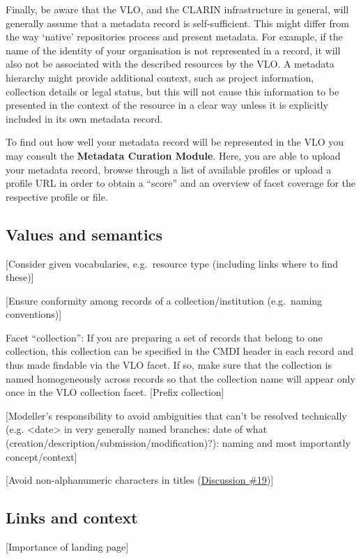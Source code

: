 Finally, be aware that the VLO, and the CLARIN infrastructure in general, will generally assume that a metadata record is
self-sufficient. This might differ from the way `native' repositories process and present metadata. For example, if the name of the identity of your organisation is not represented in a record, it will also not be associated with the described resources by the VLO. A metadata hierarchy might provide additional context, such as project information, collection details or legal status, but this will not cause this information to be presented in the context of the resource in a clear way unless it is explicitly included in its own metadata record.

To find out how well your metadata record will be represented in the VLO you may consult the \textbf{Metadata Curation Module}.
Here, you are able to upload your metadata record, browse through a list of available profiles or upload a profile URL in order to obtain a ``score'' and an overview of facet coverage for the respective profile or file.

\subsection{Values and semantics}\label{values-and-semantics}

[Consider given vocabularies, e.g.~resource type (including links where to find these)]

[Ensure conformity among records of a collection/institution
(e.g.~naming conventions)]

Facet ``collection'': If you are preparing a set of records that belong to one collection, this collection can be specified in the CMDI header in each record and thus made findable via the VLO facet. If so, make sure that the collection is named homogeneously across records so that the collection name will appear only once in the VLO collection facet. [Prefix collection]

[Modeller's responsibility to avoid ambiguities that can't be resolved technically (e.g. \textless{}date\textgreater{} in very generally named branches: date of what (creation/description/submission/modification)?): naming and most importantly concept/context]

[Avoid non-alphanumeric characters in titles
(\href{https://www.gitbook.com/book/cmdi-taskforce/cmdi-best-practices/discussions/19}{Discussion
\#19})]

\subsection{Links and context}\label{links-and-context}

[Importance of landing page]
